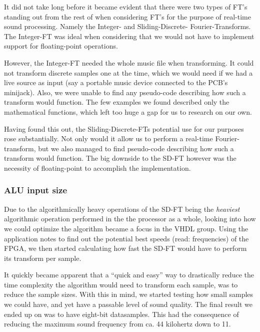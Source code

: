 It did not take long before it became evident that there were two types of FT's
standing out from the rest of when considering FT's for the purpose of real-time
sound processing. Namely the Integer- and Sliding-Discrete- Fourier-Transforms.
The Integer-FT was ideal when considering that we would not have to implement
support for floating-point operations.

However, the Integer-FT needed the whole music file when transforming. It could
not transform discrete samples one at the time, which we would need if we had a
live source as input (say a portable music device connected to the PCB's
minijack). Also, we were unable to find any pseudo-code describing how such a
transform would function. The few examples we found described only the
mathematical functions, which left too huge a gap for us to research on our own.

Having found this out, the Sliding-Discrete-FTs potential use for our purposes
rose substantially. Not only would it allow us to perform a real-time
Fourier-transform, but we also managed to find pseudo-code describing how such a
transform would function. The big downside to the SD-FT however was the
necessity of floating-point to accomplish the implementation.

\FloatBarrier
\subsubsection{ALU input size}

Due to the algorithmically heavy operations of the SD-FT being the
\emph{heaviest} algorithmic operation performed in the the processor as a whole,
looking into how we could optimize the algorithm became a focus in the VHDL
group. Using the application notes to find out the potential best speeds (read:
frequencies) of the FPGA, we then started calculating how fast the SD-FT would
have to perform its transform per sample.

It quickly became apparent that a ``quick and easy'' way to drastically reduce
the time complexity the algorithm would need to transform each sample, was to
reduce the sample sizes. With this in mind, we started testing how
small samples we could have, and yet have a passable level of sound quality. The
final result we ended up on was to have eight-bit datasamples. This had the
consequence of reducing the maximum sound frequency from ca. 44 kilohertz down
to 11.

